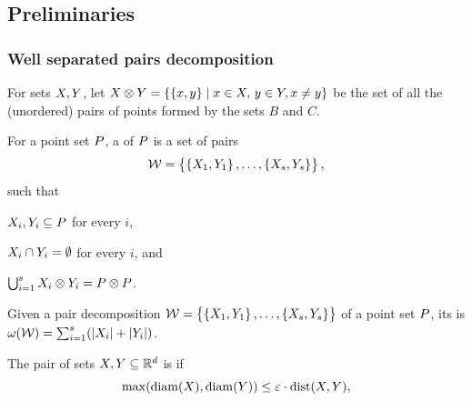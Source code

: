 \documentclass[12pt]{article}%
\begin{document}
\subsection{Preliminaries}

\subsubsection{Well separated pairs decomposition}

For sets $X, Y$, let
\begin{math}
    \PSX \otimes \PSY%
    =%
    \Set{\brc{\px,\py}}{ \px\in \PSX,\, \py\in \PSY, \px \ne \py }
\end{math}
be the set of all the (unordered) pairs of points
formed by the sets $B$ and $C$.

\begin{defn}
    For a point set $P$, a  of $P$ is a set of pairs
    \begin{equation*}        
        \mathcal{W} = \left\{ {\bigl. \left\{ {X_1,Y_1} \right\},\ldots,\left\{ {X_s,Y_s} \right\}} \right\},
    \end{equation*}
    such that
    \begin{enumerate*}[label=(\Roman*)]
        \item $X_i,Y_i\subseteq P$ for every $i$,
        \item $X_i \cap Y_i = \emptyset$ for every $i$, and
        \item $\bigcup_{i=1}^s X_i \otimes Y_i = P \otimes P$.
    \end{enumerate*}
\end{defn}

\begin{defn}
    Given a pair decomposition
    $\mathcal{W} = \left\{ {\bigl. \left\{ {X_1,Y_1} \right\},\ldots,\left\{ {X_s,
          Y_s} \right\}} \right\}$ of a point set $P$, its  is
    $\WeightX{\WS} = \sum_{i=1}^s \pth{ \cardin{\PSX_i } +
       \cardin{\PSY_i}}$.
\end{defn}


\begin{defn}
    The pair of sets $X, Y \subseteq \mathbb{R}^d$ is
     if
    \begin{equation*}
        \max \pth{ \diameterX{\PSX}, \diameterX{\PSY} } \leq
        \eps \cdot \DistSetY{\PSX}{\PSY},
    \end{equation*}
\end{defn}
\end{document}
